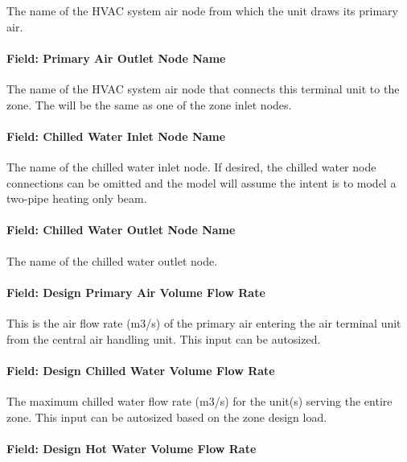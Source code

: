 The name of the HVAC system air node from which the unit draws its primary air.

\paragraph{Field: Primary Air Outlet Node Name}\label{field-primary-air-outlet-node-name}

The name of the HVAC system air node that connects this terminal unit to the zone. The will be the same as one of the zone inlet nodes.

\paragraph{Field: Chilled Water Inlet Node Name}\label{field-chilled-water-inlet-node-name}

The name of the chilled water inlet node. If desired, the chilled water node connections can be omitted and the model will assume the intent is to model a two-pipe heating only beam.

\paragraph{Field: Chilled Water Outlet Node Name}\label{field-chilled-water-outlet-node-name}

The name of the chilled water outlet node.

\paragraph{Field: Design Primary Air Volume Flow Rate}\label{field-design-primary-air-volume-flow-rate}

This is the air flow rate (m3/s) of the primary air entering the air terminal unit from the central air handling unit. This input can be autosized.

\paragraph{Field: Design Chilled Water Volume Flow Rate}\label{field-design-chilled-water-volume-flow-rate}

The maximum chilled water flow rate (m3/s) for the unit(s) serving the entire zone. This input can be autosized based on the zone design load.

\paragraph{Field: Design Hot Water Volume Flow Rate}\label{field-design-hot-water-volume-flow-rate}

